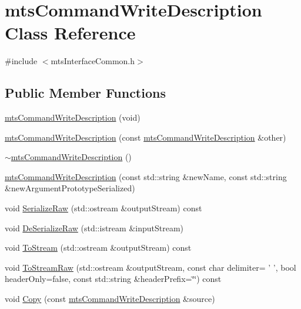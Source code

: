 \hypertarget{classmts_command_write_description}{\section{mts\-Command\-Write\-Description Class Reference}
\label{classmts_command_write_description}
}


{\ttfamily \#include $<$mts\-Interface\-Common.\-h$>$}

\subsection*{Public Member Functions}
\begin{DoxyCompactItemize}
\item 
\hyperlink{classmts_command_write_description_a1c47077ea57d5477dedd5994e56e81f1}{mts\-Command\-Write\-Description} (void)
\item 
\hyperlink{classmts_command_write_description_a6f45670abee5e88f2e48f07d4d22bf8a}{mts\-Command\-Write\-Description} (const \hyperlink{classmts_command_write_description}{mts\-Command\-Write\-Description} \&other)
\item 
\hyperlink{classmts_command_write_description_a67177c3a65d4908c5e9bd1ff0062f89f}{$\sim$mts\-Command\-Write\-Description} ()
\item 
\hyperlink{classmts_command_write_description_a7643bfcafa111c7ea6a5c01a65a7ced2}{mts\-Command\-Write\-Description} (const std\-::string \&new\-Name, const std\-::string \&new\-Argument\-Prototype\-Serialized)
\item 
void \hyperlink{classmts_command_write_description_a52754ff0cc1d5f4b790099f52e1046a2}{Serialize\-Raw} (std\-::ostream \&output\-Stream) const 
\item 
void \hyperlink{classmts_command_write_description_a3f8691fdc29b0950f1ee39f204b36e0e}{De\-Serialize\-Raw} (std\-::istream \&input\-Stream)
\item 
void \hyperlink{classmts_command_write_description_a6f74c9163daeb410a5beb5bd450aa0ce}{To\-Stream} (std\-::ostream \&output\-Stream) const 
\item 
void \hyperlink{classmts_command_write_description_ada69d284215c92bae33ca9baa42f7398}{To\-Stream\-Raw} (std\-::ostream \&output\-Stream, const char delimiter= ' ', bool header\-Only=false, const std\-::string \&header\-Prefix=\char`\"{}\char`\"{}) const 
\item 
void \hyperlink{classmts_command_write_description_abc658ed697b820ccf691dee2fe067cc7}{Copy} (const \hyperlink{classmts_command_write_description}{mts\-Command\-Write\-Description} \&source)

\end{DoxyCompactItemize}
